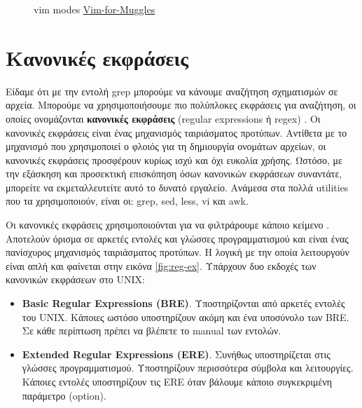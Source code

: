 \begin{figure}[!h]
	\centering
	\caption{vim modes \href{https://github.com/nilp0inter/Vim-for-Muggles}{Vim-for-Muggles}}
\end{figure} 


\section{Κανονικές εκφράσεις}



Είδαμε ότι με την εντολή grep μπορούμε να  κάνουμε αναζήτηση σχηματισμών σε αρχεία. Μπορούμε να χρησιμοποιήσουμε πιο πολύπλοκες εκφράσεις
για αναζήτηση, οι οποίες ονομάζονται \textbf{κανονικές εκφράσεις} (regular expressions ή regex) \cite{nemeth2011unix}\cite{kochan2016shell}. Οι κανονικές εκφράσεις είναι ένας
μηχανισμός ταιριάσματος προτύπων. Αντίθετα με το μηχανισμό που χρησιμοποιεί ο φλοιός για τη δημιουργία ονομάτων αρχείων, οι κανονικές
εκφράσεις προσφέρουν κυρίως ισχύ και όχι ευκολία χρήσης. Ωστόσο, με την εξάσκηση και προσεκτική επισκόπηση όσων κανονικών εκφράσεων
συναντάτε, μπορείτε να εκμεταλλευτείτε αυτό το δυνατό εργαλείο. Ανάμεσα στα πολλά utilities που τα χρησιμοποιούν, είναι οι: grep, sed, less, vi και awk.

Οι κανονικές εκφράσεις χρησιμοποιούνται για να φιλτράρουμε κάποιο κείμενο \cite{blum2008linux}. Αποτελούν όρισμα σε αρκετές εντολές και γλώσσες προγραμματισμού και είναι ένας πανίσχυρος μηχανισμός ταιριάσματος προτύπων. Η λογική με την οποία λειτουργούν είναι απλή και φαίνεται στην εικόνα \ref{fig:reg-ex}.
Υπάρχουν δυο εκδοχές των κανονικών εκφράσεων στο UNIX:
\begin{itemize}
	\item \textbf{Basic Regular Expressions (BRE)}. Υποστηρίζονται από αρκετές εντολές του UNIX. Κάποιες ωστόσο υποστηρίζουν ακόμη και ένα υποσύνολο των BRE. Σε κάθε περίπτωση πρέπει να βλέπετε το manual των εντολών.
	\item \textbf{Extended Regular Expressions (ERE)}. Συνήθως υποστηρίζεται στις γλώσσες προγραμματισμού. Υποστηρίζουν περισσότερα σύμβολα και λειτουργίες. Κάποιες εντολές υποστηρίζουν τις ERE όταν βάλουμε κάποιο συγκεκριμένη παράμετρο (option).
\end{itemize}

